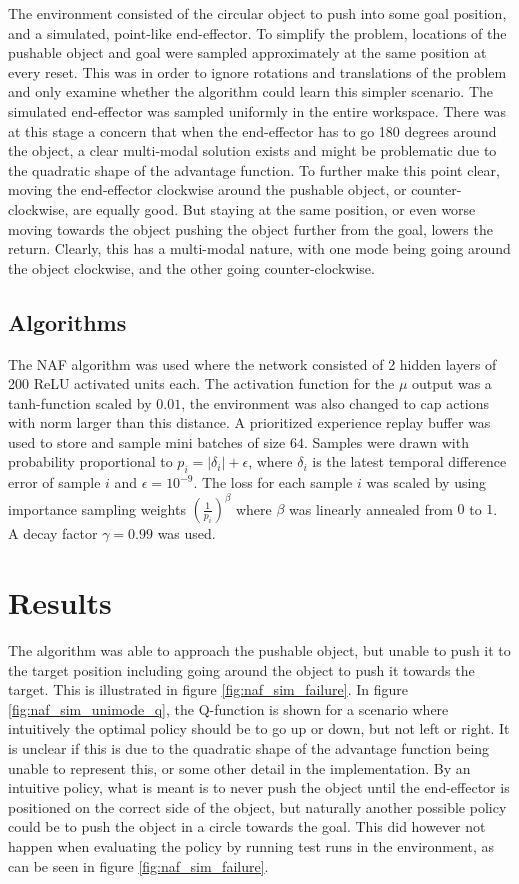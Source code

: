 The environment consisted of the circular object to push into some goal
position, and a simulated, point-like end-effector. To simplify the problem,
locations of the pushable object and goal were sampled approximately at the
same position at every reset. This was in order to ignore rotations and
translations of the problem and only examine whether the algorithm could learn
this simpler scenario. The simulated end-effector was sampled uniformly in the
entire workspace. There was at this stage a concern that when the end-effector
has to go 180 degrees around the object, a clear multi-modal solution exists
and might be problematic due to the quadratic shape of the advantage function.
To further make this point clear, moving the end-effector clockwise around the
pushable object, or counter-clockwise, are equally good.  But staying at the
same position, or even worse moving towards the object pushing the object
further from the goal, lowers the return. Clearly, this has a multi-modal
nature, with one mode being going around the object clockwise, and the other
going counter-clockwise. 

\subsection{Algorithms}

The NAF algorithm was used where the network consisted of 2 hidden layers of
200 ReLU activated units each. The activation function for the $\mu$ output was
a tanh-function scaled by $0.01$, the environment was also changed to cap
actions with norm larger than this distance. A prioritized experience replay
buffer was used to store and sample mini batches of size $64$. Samples were
drawn with probability proportional to $p_i = |\delta_i| + \epsilon$, where
$\delta_i$ is the latest temporal difference error of sample $i$ and $\epsilon
= 10^{-9}$.  The loss for each sample $i$ was scaled by using importance
sampling weights $\left( \frac{1}{p_i}\right) ^\beta$ where $\beta$ was
linearly annealed from $0$ to $1$. A decay factor $\gamma = 0.99$ was used.

\section{Results}

The algorithm was able to approach the pushable object, but unable to push it
to the target position including going around the object to push it towards the
target. This is illustrated in figure \ref{fig:naf_sim_failure}. In figure
\ref{fig:naf_sim_unimode_q}, the Q-function is shown for a scenario where
intuitively the optimal policy should be to go up or down, but not left or
right. It is unclear if this is due to the quadratic shape of the advantage
function being unable to represent this, or some other detail in the
implementation. By an intuitive policy, what is meant is to never push the
object until the end-effector is positioned on the correct side of the object,
but naturally another possible policy could be to push the object in a circle
towards the goal. This did however not happen when evaluating the policy by
running test runs in the environment, as can be seen in figure
\ref{fig:naf_sim_failure}.

